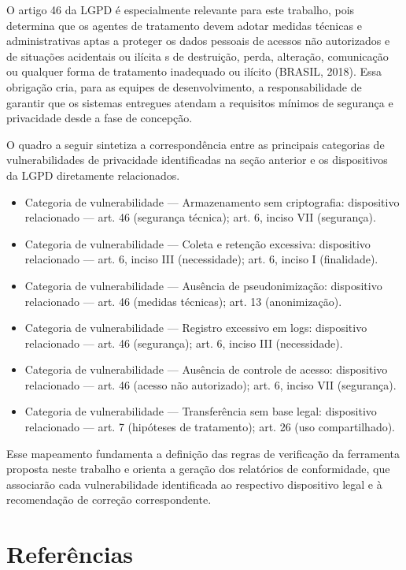 \documentclass[oneside]{normas-utf-tex}
\begin{document}
O artigo 46 da LGPD é especialmente relevante para este trabalho, pois determina que os agentes de tratamento devem adotar medidas técnicas e administrativas aptas a proteger os dados pessoais de acessos não autorizados e de situações acidentais ou ilícita s de destruição, perda, alteração, comunicação ou qualquer forma de tratamento inadequado ou ilícito (BRASIL, 2018). Essa obrigação cria, para as equipes de desenvolvimento, a responsabilidade de garantir que os sistemas entregues atendam a requisitos mínimos de segurança e privacidade desde a fase de concepção.

O quadro a seguir sintetiza a correspondência entre as principais categorias de vulnerabilidades de privacidade identificadas na seção anterior e os dispositivos da LGPD diretamente relacionados.

\begin{itemize}
\item Categoria de vulnerabilidade — Armazenamento sem criptografia: dispositivo relacionado — art. 46 (segurança técnica); art. 6, inciso VII (segurança).
\item Categoria de vulnerabilidade — Coleta e retenção excessiva: dispositivo relacionado — art. 6, inciso III (necessidade); art. 6, inciso I (finalidade).
\item Categoria de vulnerabilidade — Ausência de pseudonimização: dispositivo relacionado — art. 46 (medidas técnicas); art. 13 (anonimização).
\item Categoria de vulnerabilidade — Registro excessivo em logs: dispositivo relacionado — art. 46 (segurança); art. 6, inciso III (necessidade).
\item Categoria de vulnerabilidade — Ausência de controle de acesso: dispositivo relacionado — art. 46 (acesso não autorizado); art. 6, inciso VII (segurança).
\item Categoria de vulnerabilidade — Transferência sem base legal: dispositivo relacionado — art. 7 (hipóteses de tratamento); art. 26 (uso compartilhado).
\end{itemize}

Esse mapeamento fundamenta a definição das regras de verificação da ferramenta proposta neste trabalho e orienta a geração dos relatórios de conformidade, que associarão cada vulnerabilidade identificada ao respectivo dispositivo legal e à recomendação de correção correspondente.
\chapter*{Referências}
\end{document}

